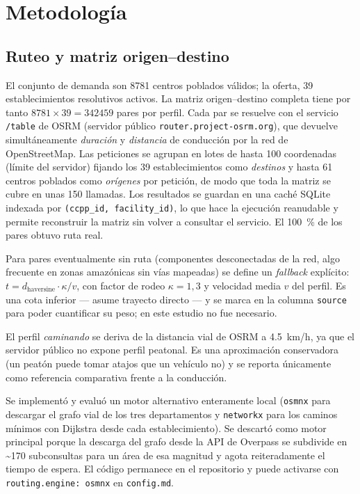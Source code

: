 \documentclass[11pt,a4paper]{article}
\begin{document}
\section{Metodolog\'ia}

\subsection{Ruteo y matriz origen--destino}
El conjunto de demanda son \num{8781} centros poblados v\'alidos; la oferta,
\num{39} establecimientos resolutivos activos. La matriz origen--destino
completa tiene por tanto $\num{8781}\times\num{39}=\num{342459}$ pares por
perfil. Cada par se resuelve con el servicio \texttt{/table} de OSRM (servidor
p\'ublico \texttt{router.project-osrm.org}), que devuelve simult\'aneamente
\emph{duraci\'on} y \emph{distancia} de conducci\'on por la red de
OpenStreetMap. Las peticiones se agrupan en lotes de hasta 100 coordenadas
(l\'imite del servidor) fijando los \num{39} establecimientos como
\emph{destinos} y hasta \num{61} centros poblados como \emph{or\'igenes} por
petici\'on, de modo que toda la matriz se cubre en unas 150 llamadas. Los
resultados se guardan en una cach\'e SQLite indexada por
\texttt{(ccpp\_id, facility\_id)}, lo que hace la ejecuci\'on reanudable y
permite reconstruir la matriz sin volver a consultar el servicio. El
\SI{100}{\percent} de los pares obtuvo ruta real.

Para pares eventualmente sin ruta (componentes desconectadas de la red, algo
frecuente en zonas amaz\'onicas sin v\'ias mapeadas) se define un
\emph{fallback} expl\'icito: $t = d_{\text{haversine}}\cdot \kappa / v$, con
factor de rodeo $\kappa=1{,}3$ y velocidad media $v$ del perfil. Es una cota
inferior --- asume trayecto directo --- y se marca en la columna
\texttt{source} para poder cuantificar su peso; en este estudio no fue
necesario.

El perfil \emph{caminando} se deriva de la distancia vial de OSRM a
\num{4.5}~km/h, ya que el servidor p\'ublico no expone perfil peatonal.
Es una aproximaci\'on conservadora (un peat\'on puede tomar atajos que un
veh\'iculo no) y se reporta \'unicamente como referencia comparativa frente a
la conducci\'on.

Se implement\'o y evalu\'o un motor alternativo enteramente local
(\texttt{osmnx} para descargar el grafo vial de los tres departamentos y
\texttt{networkx} para los caminos m\'inimos con Dijkstra desde cada
establecimiento). Se descart\'o como motor principal porque la descarga del
grafo desde la API de Overpass se subdivide en \textasciitilde170 subconsultas
para un \'area de esa magnitud y agota reiteradamente el tiempo de espera. El
c\'odigo permanece en el repositorio y puede activarse con
\texttt{routing.engine: osmnx} en \texttt{config.md}.
\end{document}

